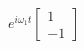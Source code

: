 \documentclass[preview]{standalone}
\begin{document}
\begin{center}
$e^{i\omega_1 t}\begin{bmatrix} 1 \\ -1\end{bmatrix}$
\end{center}
\end{document}

